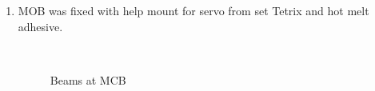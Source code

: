 \begin{enumerate}
\begin{enumerate}
		\item MOB was fixed with help mount for servo from set Tetrix and hot melt adhesive.
	    \begin{figure}[H]
			\begin{minipage}[h]{0.47\linewidth}
				\caption{Beams at MCB}  
			\end{minipage}
			\hfill
			\begin{minipage}[h]{0.47\linewidth}

\end{minipage}
\end{figure}
\end{enumerate}
\end{enumerate}
